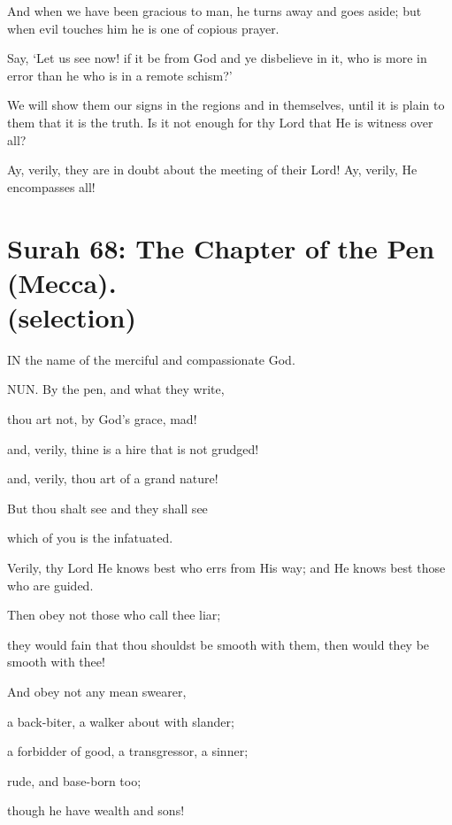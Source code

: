\documentclass[fontsize=14pt, letterpaper, notitlepage, openany, DIV=12]{scrbook} %
\begin{document}
\noindent[41:51]
And when we have been gracious to man, he turns away and goes aside; but when evil
touches him he is one of copious prayer.

\noindent[41:52]
Say, `Let us see now! if it be from God and ye disbelieve in it, who is more in error than
he who is in a remote schism?'

\noindent[41:53]
We will show them our signs in the regions and in themselves, until it is plain to them
that it is the truth. Is it not enough for thy Lord that He is witness over all?

\noindent[41:54]
Ay, verily, they are in doubt about the meeting of their Lord! Ay, verily, He encompasses
all!


\section[Surah 68: The Chapter of the Pen (Mecca).]{Surah 68: The Chapter of the Pen (Mecca).\\ (selection)}


IN the name of the merciful and compassionate God.

\noindent[68:1]
NUN. By the pen, and what they write,

\noindent[68:2]
thou art not, by God's grace, mad!

\noindent[68:3]
and, verily, thine is a hire that is not grudged!

\noindent[68:4]
and, verily, thou art of a grand nature!

\noindent[68:5]
But thou shalt see and they shall see

\noindent[68:6]
which of you is the infatuated.

\noindent[68:7]
Verily, thy Lord He knows best who errs from His way; and He knows best those who
are guided.

\noindent[68:8]
Then obey not those who call thee liar;

\noindent[68:9]
they would fain that thou shouldst be smooth with them, then would they be smooth with
thee!

\noindent[68:10]
And obey not any mean swearer,

\noindent[68:11]
a back-biter, a walker about with slander;

\noindent[68:12]
a forbidder of good, a transgressor, a sinner;

\noindent[68:13]
rude, and base-born too;

\noindent[68:14]
though he have wealth and sons!
\end{document}
